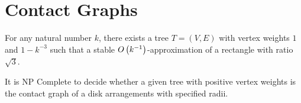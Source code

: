 \section{Contact Graphs}
\begin{lem}\label{lem:ContactGraphV3-1}
For any natural number $k$,  there exists a tree $T = (V,E)$ with vertex weights $1$ and $1 - k^{-3}$ such that a stable $O\left( k^{-1} \right)$-approximation of a rectangle with ratio $\sqrt{3}$.
\end{lem}
\begin{thm}
It is NP Complete to decide whether a given tree with positive vertex weights is the contact graph of a disk arrangements with specified radii.
\end{thm}
